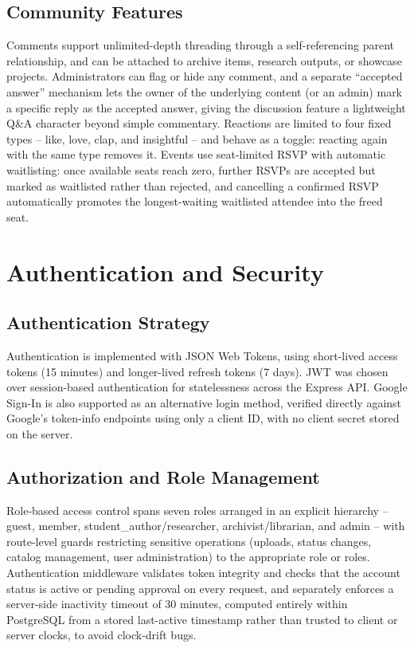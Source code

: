 \documentclass[12pt]{article}
\begin{document}
\subsection{Community Features}
Comments support unlimited-depth threading through a self-referencing parent relationship, and can be attached to archive items, research outputs, or showcase projects. Administrators can flag or hide any comment, and a separate ``accepted answer'' mechanism lets the owner of the underlying content (or an admin) mark a specific reply as the accepted answer, giving the discussion feature a lightweight Q\&A character beyond simple commentary. Reactions are limited to four fixed types -- like, love, clap, and insightful -- and behave as a toggle: reacting again with the same type removes it. Events use seat-limited RSVP with automatic waitlisting: once available seats reach zero, further RSVPs are accepted but marked as waitlisted rather than rejected, and cancelling a confirmed RSVP automatically promotes the longest-waiting waitlisted attendee into the freed seat.

\section{Authentication and Security}

\subsection{Authentication Strategy}
Authentication is implemented with JSON Web Tokens, using short-lived access tokens (15 minutes) and longer-lived refresh tokens (7 days). JWT was chosen over session-based authentication for statelessness across the Express API. Google Sign-In is also supported as an alternative login method, verified directly against Google's token-info endpoints using only a client ID, with no client secret stored on the server.

\subsection{Authorization and Role Management}
Role-based access control spans seven roles arranged in an explicit hierarchy -- guest, member, student\_author/researcher, archivist/librarian, and admin -- with route-level guards restricting sensitive operations (uploads, status changes, catalog management, user administration) to the appropriate role or roles. Authentication middleware validates token integrity and checks that the account status is active or pending approval on every request, and separately enforces a server-side inactivity timeout of 30 minutes, computed entirely within PostgreSQL from a stored last-active timestamp rather than trusted to client or server clocks, to avoid clock-drift bugs.
\end{document}
